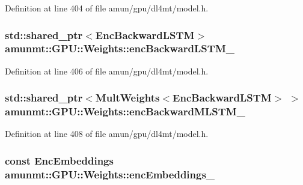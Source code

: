 Definition at line 404 of file amun/gpu/dl4mt/model.\+h.

\subsubsection[{\texorpdfstring{enc\+Backward\+L\+S\+T\+M\+\_\+}{encBackwardLSTM_}}]{\setlength{\rightskip}{0pt plus 5cm}std\+::shared\+\_\+ptr$<${\bf Enc\+Backward\+L\+S\+TM}$>$ amunmt\+::\+G\+P\+U\+::\+Weights\+::enc\+Backward\+L\+S\+T\+M\+\_\+}\hypertarget{structamunmt_1_1GPU_1_1Weights_a10f4a480601758e649528fcfa51427d0}{}\label{structamunmt_1_1GPU_1_1Weights_a10f4a480601758e649528fcfa51427d0}


Definition at line 406 of file amun/gpu/dl4mt/model.\+h.

\subsubsection[{\texorpdfstring{enc\+Backward\+M\+L\+S\+T\+M\+\_\+}{encBackwardMLSTM_}}]{\setlength{\rightskip}{0pt plus 5cm}std\+::shared\+\_\+ptr$<${\bf Mult\+Weights}$<${\bf Enc\+Backward\+L\+S\+TM}$>$ $>$ amunmt\+::\+G\+P\+U\+::\+Weights\+::enc\+Backward\+M\+L\+S\+T\+M\+\_\+}\hypertarget{structamunmt_1_1GPU_1_1Weights_ac64f6043d8c81c154a0d751c2a95e9bf}{}\label{structamunmt_1_1GPU_1_1Weights_ac64f6043d8c81c154a0d751c2a95e9bf}


Definition at line 408 of file amun/gpu/dl4mt/model.\+h.

\subsubsection[{\texorpdfstring{enc\+Embeddings\+\_\+}{encEmbeddings_}}]{\setlength{\rightskip}{0pt plus 5cm}const {\bf Enc\+Embeddings} amunmt\+::\+G\+P\+U\+::\+Weights\+::enc\+Embeddings\+\_\+}\hypertarget{structamunmt_1_1GPU_1_1Weights_aa829b8f4fe98e626cec7943d544eeb8a}{}\label{structamunmt_1_1GPU_1_1Weights_aa829b8f4fe98e626cec7943d544eeb8a}



